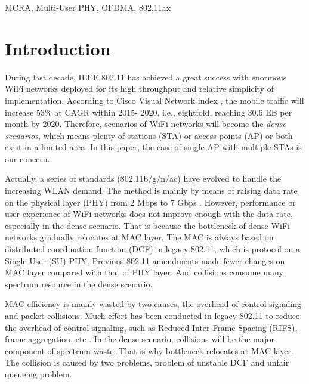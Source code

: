 \documentclass[journal]{IEEEtran}
\begin{document}
\begin{IEEEkeywords}
MCRA, Multi-User PHY, OFDMA, 802.11ax
\end{IEEEkeywords}






%
\IEEEpeerreviewmaketitle
\section{Introduction}		\label{Intro}

During last decade, IEEE 802.11 has achieved a great success with enormous WiFi networks deployed for its high throughput and relative simplicity of implementation.
According to Cisco Visual Network index \cite{cisco2016}, the mobile traffic will increase 53\% at CAGR within 2015-
2020, i.e., eightfold, reaching 30.6 EB per month by 2020.
Therefore, scenarios of WiFi networks will become the \textit{dense scenarios}, which means plenty of stations (STA) or access points (AP) or both exist in a limited area. 
In this paper, the case of single AP with multiple STAs is our concern. 

Actually, a series of standards (802.11b/g/n/ac) have evolved to handle the increasing WLAN demand.
The method is mainly by means of raising data rate on the physical layer (PHY)  from 2 Mbps to 7 Gbps \cite{perahia2013next}.
However, performance or user experience of WiFi networks does not improve enough with the data rate, especially in the dense scenario. 
That is because the bottleneck of dense WiFi networks gradually relocates at MAC layer.
The MAC is always based on distributed coordination function (DCF) in legacy 802.11, which is protocol on a Single-User (SU) PHY. 
Previous 802.11 amendments made fewer changes on MAC layer compared with that of PHY layer. 
And collisions consume many spectrum resource in the dense scenario.

MAC efficiency is mainly wasted by two causes, the overhead of control signaling and packet collisions.
Much effort has been conducted in legacy 802.11 to reduce the overhead of control signaling, such as Reduced Inter-Frame Spacing (RIFS), frame aggregation, etc \cite{perahia2013next}. 
In the dense scenario, collisions will be the major component of spectrum waste.
That is why bottleneck relocates at MAC layer.
The collision is caused by two problems, problem of unstable DCF and unfair queueing problem.
\end{document}

